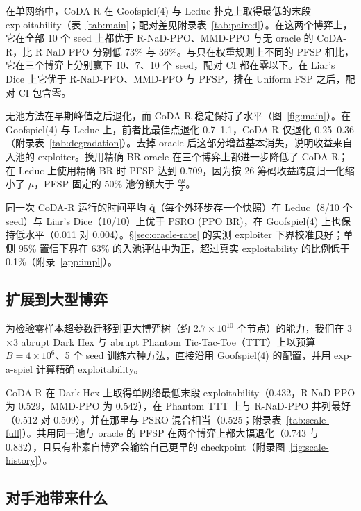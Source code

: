 \documentclass{article}
\theoremstyle{plain}
\theoremstyle{remark}
\newcommand{\bq}{{\bm{q}}}
\newcommand{\codar}{CoDA-R}
\newcommand{\rnad}{R-NaD-PPO}
\begin{document}
在单网络中，\codar{} 在 Goofspiel(4) 与 Leduc 扑克上取得最低的末段 exploitability（表~\ref{tab:main}；配对差见附录表~\ref{tab:paired}）。在这两个博弈上，它在全部 10 个 seed 上都优于 \rnad{}、MMD-PPO 与无 oracle 的 \codar{}，比 \rnad{} 分别低 73\% 与 36\%。与只在权重规则上不同的 PFSP 相比，它在三个博弈上分别赢下 10、7、10 个 seed，配对 CI 都在零以下。在 Liar's Dice 上它优于 \rnad{}、MMD-PPO 与 PFSP，排在 Uniform FSP 之后，配对 CI 包含零。

无池方法在早期峰值之后退化，而 \codar{} 稳定保持了水平（图~\ref{fig:main}）。在 Goofspiel(4) 与 Leduc 上，前者比最佳点退化 0.7--1.1，\codar{} 仅退化 0.25--0.36（附录表~\ref{tab:degradation}）。去掉 oracle 后这部分增益基本消失，说明收益来自入池的 exploiter。换用精确 BR oracle 在三个博弈上都进一步降低了 \codar{}；在 Leduc 上使用精确 BR 时 PFSP 达到 0.709，因为按 26 筹码收益跨度归一化缩小了 $\mu$，PFSP 固定的 50\% 池份额大于 $\tfrac{c\mu}2$。

同一次 \codar{} 运行的时间平均 $\bar{\bq}$（每个外环步存一个快照）在 Leduc（8/10 个 seed）与 Liar's Dice（10/10）上优于 PSRO (PPO BR)，在 Goofspiel(4) 上也保持低水平（0.011 对 0.004）。\S\ref{sec:oracle-rate} 的实测 exploiter 下界校准良好；单侧 95\% 置信下界在 63\% 的入池评估中为正，超过真实 exploitability 的比例低于 0.1\%（附录~\ref{app:impl}）。

\subsection{扩展到大型博弈}
\label{sec:exp-scale}

为检验零样本超参数迁移到更大博弈树（约 $2.7\times10^{10}$ 个节点）的能力，我们在 3$\times$3 abrupt Dark Hex 与 abrupt Phantom Tic-Tac-Toe（TTT）上以预算 $B=4\times10^6$、5 个 seed 训练六种方法，直接沿用 Goofspiel(4) 的配置，并用 exp-a-spiel\citep{rudolph2025reevaluating} 计算精确 exploitability。

\codar{} 在 Dark Hex 上取得单网络最低末段 exploitability（0.432，\rnad{} 为 0.529，MMD-PPO 为 0.542），在 Phantom TTT 上与 \rnad{} 并列最好（0.512 对 0.509），并在那里与 PSRO 混合相当（0.525；附录表~\ref{tab:scale-full}）。共用同一池与 oracle 的 PFSP 在两个博弈上都大幅退化（0.743 与 0.832），且只有朴素自博弈会输给自己更早的 checkpoint（附录图~\ref{fig:scale-history}）。

\subsection{对手池带来什么}
\label{sec:exp-mech}
\end{document}
